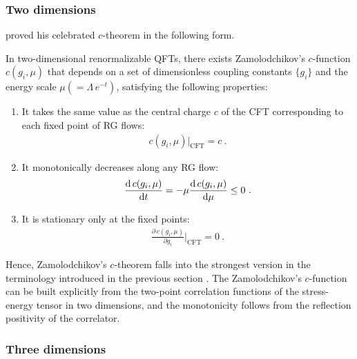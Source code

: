 \subsubsection{Two dimensions}
\textcite{Zamolodchikov:1986gt} proved his celebrated $c$-theorem in the following form.

\begin{theorem*}
In two-dimensional renormalizable QFTs, there exists Zamolodchikov's $c$-function $c(g_i, \mu)$ that depends on a set of dimensionless coupling constants $\{ g_i\}$ and the energy scale $\mu (= \Lambda\,e^{-t})$, satisfying the following properties:
\begin{enumerate}
\item It takes the same value as the central charge $c$ of the CFT corresponding to each fixed point of RG flows:
	\begin{align}
		c(g_i, \mu)|_\mathrm{CFT} = c \ .
	\end{align}
\item It monotonically decreases along any RG flow:
	\begin{align}
		\frac{\mathrm{d}\, c(g_i, \mu)}{\mathrm{d} t} = - \mu \frac{\mathrm{d}\, c(g_i, \mu)}{\mathrm{d}\mu} \le 0 \ .
	\end{align}
\item It is stationary only at the fixed points:
	\begin{align}
		\frac{\partial\, c(g_i, \mu)}{\partial g_i}\bigg|_\mathrm{CFT} = 0 \ .
	\end{align}
\end{enumerate}
\end{theorem*}
Hence, Zamolodchikov's $c$-theorem falls into the strongest version in the terminology introduced in the previous section \cite{Friedan:2009ik}.
The Zamolodchikov's $c$-function can be built explicitly from the two-point correlation functions of the stress-energy tensor in two dimensions, and the monotonicity follows from the reflection positivity of the correlator.


\subsubsection{Three dimensions}

